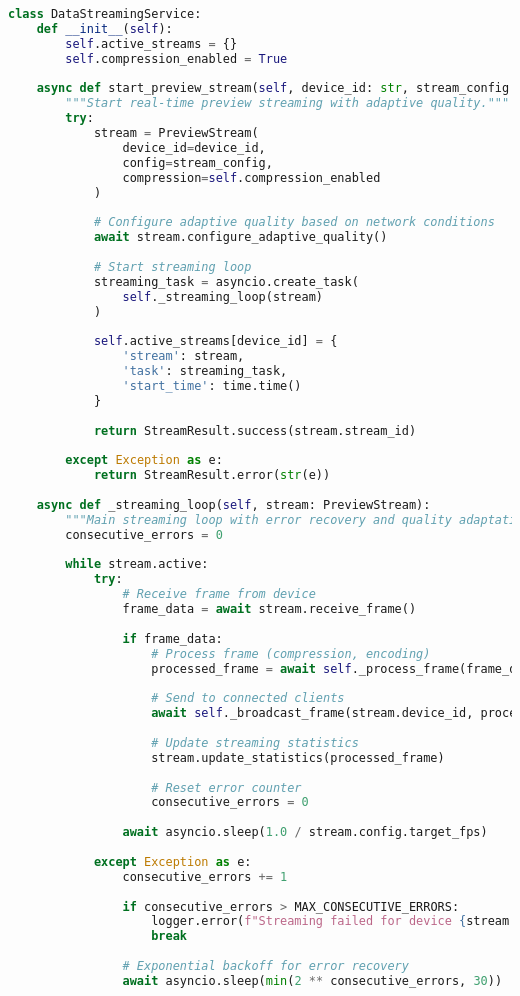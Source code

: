 \documentclass[11pt,a4paper]{report}
\begin{document}
\begin{lstlisting}[language=Python]
class DataStreamingService:
    def __init__(self):
        self.active_streams = {}
        self.compression_enabled = True
        
    async def start_preview_stream(self, device_id: str, stream_config: StreamConfig) -> StreamResult:
        """Start real-time preview streaming with adaptive quality."""
        try:
            stream = PreviewStream(
                device_id=device_id,
                config=stream_config,
                compression=self.compression_enabled
            )
            
            # Configure adaptive quality based on network conditions
            await stream.configure_adaptive_quality()
            
            # Start streaming loop
            streaming_task = asyncio.create_task(
                self._streaming_loop(stream)
            )
            
            self.active_streams[device_id] = {
                'stream': stream,
                'task': streaming_task,
                'start_time': time.time()
            }
            
            return StreamResult.success(stream.stream_id)
            
        except Exception as e:
            return StreamResult.error(str(e))
    
    async def _streaming_loop(self, stream: PreviewStream):
        """Main streaming loop with error recovery and quality adaptation."""
        consecutive_errors = 0
        
        while stream.active:
            try:
                # Receive frame from device
                frame_data = await stream.receive_frame()
                
                if frame_data:
                    # Process frame (compression, encoding)
                    processed_frame = await self._process_frame(frame_data, stream.config)
                    
                    # Send to connected clients
                    await self._broadcast_frame(stream.device_id, processed_frame)
                    
                    # Update streaming statistics
                    stream.update_statistics(processed_frame)
                    
                    # Reset error counter
                    consecutive_errors = 0
                
                await asyncio.sleep(1.0 / stream.config.target_fps)
                
            except Exception as e:
                consecutive_errors += 1
                
                if consecutive_errors > MAX_CONSECUTIVE_ERRORS:
                    logger.error(f"Streaming failed for device {stream.device_id}: {e}")
                    break
                
                # Exponential backoff for error recovery
                await asyncio.sleep(min(2 ** consecutive_errors, 30))
\end{lstlisting}
\end{document}
